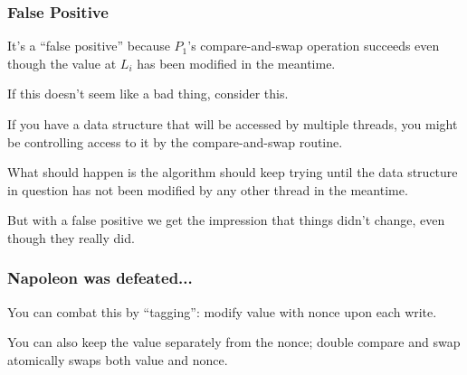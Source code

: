 \begin{frame}
\frametitle{False Positive}

It's a ``false positive'' because $P_{1}$'s compare-and-swap operation succeeds even though the value at $L_{i}$ has been modified in the meantime. 

If this doesn't seem like a bad thing, consider this. 

If you have a data structure that will be accessed by multiple threads, you might be controlling access to it by the compare-and-swap routine. 

What should happen is the algorithm should keep trying until the data structure in question has not been modified by any other thread in the meantime. 

But with a false positive we get the impression that things didn't change, even though they really did.

\end{frame}



\begin{frame}
\frametitle{Napoleon was defeated...}

You can combat this by ``tagging'': modify value with nonce upon each
write.  

You can also keep the value separately from the nonce; double
compare and swap atomically swaps both value and nonce.

\end{frame}





